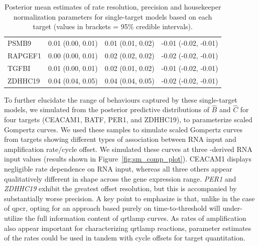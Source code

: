 \documentclass[../thesis.tex]{subfiles}
\begin{document}
\begin{table}[!t]
{\begin{tabular}{|l|lll|}
PSMB9 & 0.01 (0.00, 0.01) & 0.01 (0.01, 0.02) & -0.01 (-0.02, -0.01) \\ 
RAPGEF1 & 0.00  (0.00, 0.01) & 0.02 (0.02, 0.02) & -0.02 (-0.02, -0.01)\\ 
TGFBI & 0.01 (0.00, 0.01) & 0.02 (0.01, 0.02) & -0.01 (-0.02, -0.01) \\ 
ZDHHC19 & 0.04 (0.04, 0.05) & 0.04 (0.04, 0.05) & -0.02 (-0.02, -0.01) \\ 
\hline
\end{tabular}}
\caption{Posterior mean estimates of rate resolution, precision and housekeeper normalization parameters for single-target models based on each target (values in brackets = 95\% credible intervals).\label{tab:single_target_sens_prec_b}}
\end{table}

To further elucidate the range of behaviours captured by these single-target models, we simulated from the posterior predictive distributions of $\hat{B}$ and $\hat{C}$ for four targets ({CEACAM1}, {BATF}, {PER1}, and {ZDHHC19}), to parameterize scaled Gompertz curves. We used these samples to simulate scaled Gompertz curves from targets showing different types of association between RNA input and amplification rate/cycle offset. We simulated these curves at three -derived RNA input values (results shown in Figure~\ref{fig:sm_comp_plot}). CEACAM1 displays negligible rate dependence on RNA input, whereas all three others appear qualitatively different in shape across the gene expression range. \emph{PER1} and \emph{ZDHHC19} exhibit the greatest offset resolution, but this is accompanied by substantially worse precision. A key point to emphasize is that, unlike in the case of \gls{qpcr}, opting for an approach based purely on time-to-threshold will under-utilize the full information content of \gls{qrtlamp} curves. As rates of amplification also appear important for characterizing \gls{qrtlamp} reactions, parameter estimates of the rates could be used in tandem with cycle offsets for target quantitation.
\end{document}
